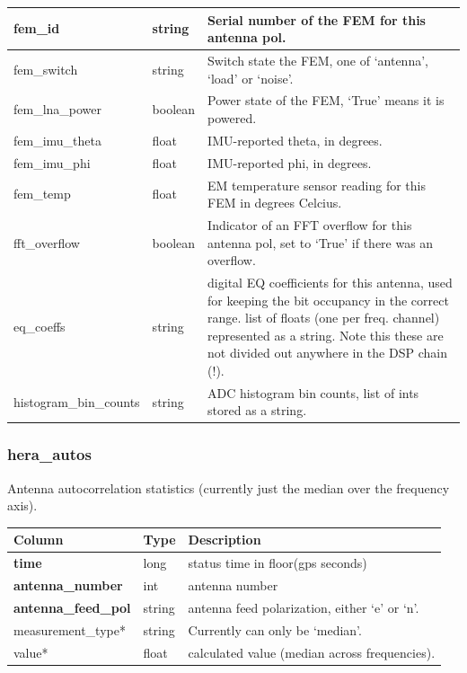 \documentclass{article}
\begin{document}
{\begin{center}
\begin{tabular}{| p{4cm} | p{2cm} | p{10cm} |}
fem\_id & string & Serial number of the FEM for this antenna pol. \\ \hline
fem\_switch & string & Switch state the FEM, one of `antenna', `load' or `noise'. \\ \hline
fem\_lna\_power & boolean & Power state of the FEM, `True' means it is powered. \\ \hline
fem\_imu\_theta & float & IMU-reported theta, in degrees. \\ \hline
fem\_imu\_phi & float & IMU-reported phi, in degrees. \\ \hline
fem\_temp & float & EM temperature sensor reading for this FEM in degrees Celcius. \\ \hline
fft\_overflow & boolean & Indicator of an FFT overflow for this antenna pol, set to `True' if there was an overflow. \\ \hline
eq\_coeffs & string & digital EQ coefficients for this antenna, used for keeping the bit occupancy in the
            correct range. list of floats (one per freq. channel) represented as a string. Note this these are
            not divided out anywhere in the DSP chain (!). \\\hline
histogram\_bin\_counts & string & ADC histogram bin counts, list of ints stored as a string. \\ \hline
\end{tabular}
\end{center}

\subsubsection{hera\_autos}
Antenna autocorrelation statistics (currently just the median over the frequency axis).
\begin{center}
\begin{tabular}{| p{4cm} | p{2cm} | p{10cm} |}
\hline
 {\bf Column} & {\bf Type}  & {\bf Description} \\ [0.5ex]  \hline\hline
\textbf{time} & long & status time in floor(gps seconds)\\ \hline
\textbf{antenna\_number} & int & antenna number \\ \hline
\textbf{antenna\_feed\_pol} & string & antenna feed polarization, either `e' or `n'. \\ \hline
measurement\_type* & string & Currently can only be `median'. \\ \hline
value* & float & calculated value (median across frequencies). \\ \hline
\end{tabular}
\end{center}

}
\end{document}
